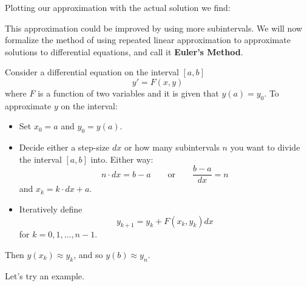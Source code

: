 \documentclass{ximera}
\begin{document}
Plotting our approximation with the actual solution we find:
\begin{image}
\end{image}
This approximation could be improved by using more subintervals.  We
will now formalize the method of using repeated linear approximation
to approximate solutions to differential equations, and call it
\textbf{Euler's Method}.

\begin{definition}
  Consider a differential equation on the interval $[a,b]$
  \[
  y' = F(x,y)
  \]
  where $F$ is a function of two variables and it is given that $y(a)
  = y_0$. To approximate $y$ on the interval:
  \begin{itemize}
  \item Set $x_0=a$ and $y_0 = y(a)$.
  \item Decide either a step-size $dx$ or how many subintervals $n$ you
    want to divide the interval $[a,b]$ into. Either way:
    \[
    n\cdot dx = b-a \qquad\text{or}\qquad \frac{b-a}{dx} = n
    \]
    and $x_k = k\cdot dx + a$.
  \item Iteratively define
    \[
    y_{k+1} = y_k + F(x_k,y_k)dx
    \]
    for $k=0,1,\dots,n-1$.
  \end{itemize}
  Then $y(x_k) \approx y_k$, and so $y(b) \approx y_{n}$.
\end{definition}

Let's try an example.
\end{document}
